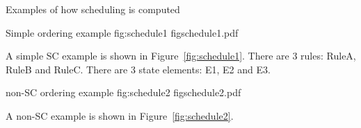 
\pnum
Examples of how scheduling is computed

\begin{importgraphic}
{Simple ordering example}
{fig:schedule1}
{figschedule1.pdf}
\end{importgraphic}
A simple SC example is shown in Figure~\ref{fig:schedule1}.  There are 3 rules: RuleA, RuleB and RuleC.  There are 3 state elements: E1, E2 and E3.

\begin{importgraphic}
{non-SC ordering example}
{fig:schedule2}
{figschedule2.pdf}
\end{importgraphic}
A non-SC example is shown in Figure~\ref{fig:schedule2}.

